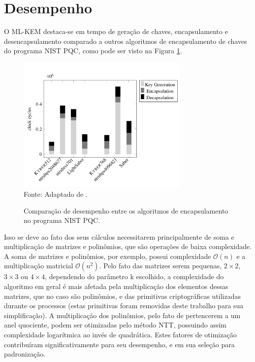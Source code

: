 \section{Desempenho}
    O \ac{ML-KEM} destaca-se em tempo de geração de chaves, encapsulamento e desencapsulamento comparado a outros algoritmos de encapsulamento de chaves do programa \ac{NIST} \ac{PQC}, como pode ser visto na Figura \ref{fig:benchmark}. 

    \begin{figure}[htb!]
        \centering
        \caption{Comparação de desempenho entre os algoritmos de encapsulamento no programa \ac{NIST} \ac{PQC}.}
        \includegraphics[width=0.75\textwidth]{Figuras/benchmark.png}\\
        \footnotesize{Fonte: Adaptado de \cite{nist_round_3_report}.}
        \label{fig:benchmark}
    \end{figure}
    
    Isso se deve ao fato dos seus cálculos necessitarem principalmente de soma e multiplicação de matrizes e polinômios, que são operações de baixa complexidade. A soma de matrizes e polinômios, por exemplo, possui complexidade $\mathcal{O}(n)$ e a multiplicação matricial $\mathcal{O}(n^2)$. Pelo fato das matrizes serem pequenas, $2 \times 2$, $3 \times 3$ ou $4 \times 4$, dependendo do parâmetro k escolhido, a complexidade do algoritmo em geral é mais afetada pela multiplicação dos elementos dessas matrizes, que no caso são polinômios, e das primitivas criptográficas utilizadas durante os processos (estas primitivas foram removidas deste trabalho para sua simplificação). A multiplicação dos polinômios, pelo fato de pertencerem a um anel quociente, podem ser otimizadas pelo método \ac{NTT}, possuindo assim complexidade logarítmica ao invés de quadrática. Estes fatores de otimização contribuíram significativamente para seu desempenho, e em sua seleção para padronização.